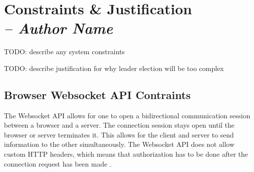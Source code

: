 \chapter{Constraints \& Justification \\
  \small{\textit{-- Author Name}}
  \label{Chapter::ConstraintsJustification}}


TODO: describe any system constraints

TODO: describe justification for why leader election will be too complex

\section{Browser Websocket API Contraints}

The Websocket API allows for one to open a bidirectional communication session between a browser and a server. The connection session stays open until the browser or server terminates it. 
This allows for the client and server to send information to the other simultaneously. The Websocket API does not allow custom HTTP headers, which means that authorization has to be done after the connection request has been made \cite{HerokuWebSocket}.